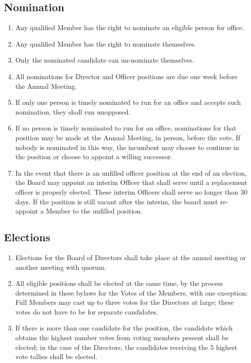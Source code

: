 \documentclass{article}
\begin{document}
\subsection{Nomination}
\begin{enumerate}
\item Any qualified Member has the right to nominate an eligible person for office.
\item Any qualified Member has the right to nominate themselves.
\item Only the nominated candidate can un-nominate themselves.
\item All nominations for Director and Officer positions are due one week before the Annual Meeting.
\item If only one person is timely nominated to run for an office and accepts such nomination, they shall run unopposed.
\item If no person is timely nominated to run for an office, nominations for that position 
may be made at the Annual Meeting, in person, before the vote. If nobody is nominated in 
this way, the incumbent may choose to continue in the position or choose to appoint a 
willing successor.
\item In the event that there is an unfilled officer position at the end of an election, the 
Board may appoint an interim Officer that shall serve until a replacement officer is properly 
elected. These interim Officers shall serve no longer than 30 days. If the position is still 
vacant after the interim, the board must re-appoint a Member to the unfilled position.
\end{enumerate}
\subsection{Elections}
\begin{enumerate}
\item Elections for the Board of Directors shall take place at the annual meeting or another meeting with quorum.
\item All eligible positions shall be elected at the same time, by the process determined in 
these bylaws for the Votes of the Members, with one exception:  Full Members may cast up 
to three votes for the Directors at large;  these votes do not have to be for separate 
candidates.
\item If there is more than one candidate for the position, the candidate which obtains the 
highest number votes from voting members present shall be elected;  in the case of the 
Directors, the candidates receiving the 5 highest vote tallies shall be elected.
\end{enumerate}
\end{document}
